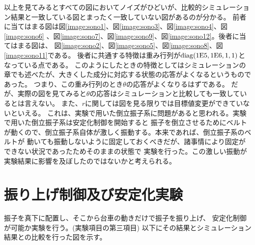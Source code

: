 	以上を見てみるとすべての図においてノイズがひどいが、比較的シミュレーション結果と一致している図とまったく一致していない図があるのが分かる。
	前者に当てはまる図は図\ref{image:sono1}、図\ref{image:sono3}、図\ref{image:sono4}、図\ref{image:sono6}
	、図\ref{image:sono7}、図\ref{image:sono9}、図\ref{image:sono12}。後者に当てはまる図は、
	図\ref{image:sono2}、図\ref{image:sono5}、図\ref{image:sono8}、図\ref{image:sono11}である。
	後者に共通する特徴は重み行列が$\rm{diag}(1E5,1E6,1,1)$となっている点である。
	このようにしたときの特徴としてはシミュレーションの章でも述べたが、大きくした成分に対応する状態の応答がよくなるというものであった。
	つまり、この重み行列のとき$\theta$の応答がよくなりるはずである。
	だが、実際の図を見てみると$\theta$の応答はシミュレーションと比較しても一致しているとは言えない。
	また、$r$に関しては図を見る限りでは目標値変更ができていないといえる。
	これは、実験で用いた倒立振子系に問題があると思われる。実験で用いた倒立振子系は安定化制御を開始すると
	振子を倒立させるためにベルトが動くので、倒立振子系自体が激しく振動する。本来であれば、倒立振子系のベルトが
	動いても振動しないように固定しておくべきだが、諸事情により固定ができない状況であったためそのままの状態で
	実験を行った。この激しい振動が実験結果に影響を及ぼしたのではないかと考えられる。
	
	

\section{振り上げ制御及び安定化実験}
	振子を真下に配置し、そこから台車の動きだけで振子を振り上げ、
	安定化制御が可能か実験を行う。(実験項目の第三項目)
	以下にその結果とシミュレーション結果との比較を行った図を示す。

